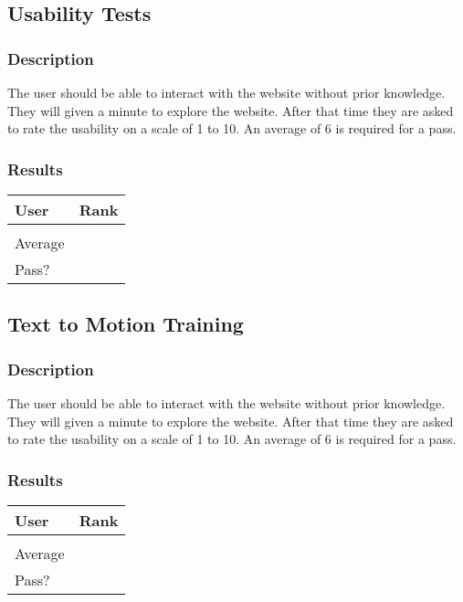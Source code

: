 \documentclass{scrreprt}
\begin{document}
\subsection{Usability Tests}
\subsubsection{Description}
\begin{flushleft}
The user should be able to interact with the website without prior knowledge. They will given a minute to explore the website. After that time they are asked to rate the usability on a scale of 1 to 10. An average of 6 is required for a pass.
\subsubsection{Results}
\end{flushleft}
 \centering
 \begin{tabular}{||p{2.5cm}|p{2.5cm}||}
 \hline
 \bf User & \bf Rank\\
 \hline\hline
 & \\
 \hline
 Average &  \\ %
 \hline
 Pass? & \\
 \hline
 \end{tabular}

\subsection{Text to Motion Training }
\subsubsection{Description}
\begin{flushleft}
The user should be able to interact with the website without prior knowledge. They will given a minute to explore the website. After that time they are asked to rate the usability on a scale of 1 to 10. An average of 6 is required for a pass.
\subsubsection{Results}
\end{flushleft}
 \centering
 \begin{tabular}{||p{2.5cm}|p{2.5cm}||}
 \hline
 \bf User & \bf Rank\\
 \hline\hline
 & \\
 \hline
 Average &  \\ %
 \hline
 Pass? & \\
 \hline
 \end{tabular}
\end{document}
